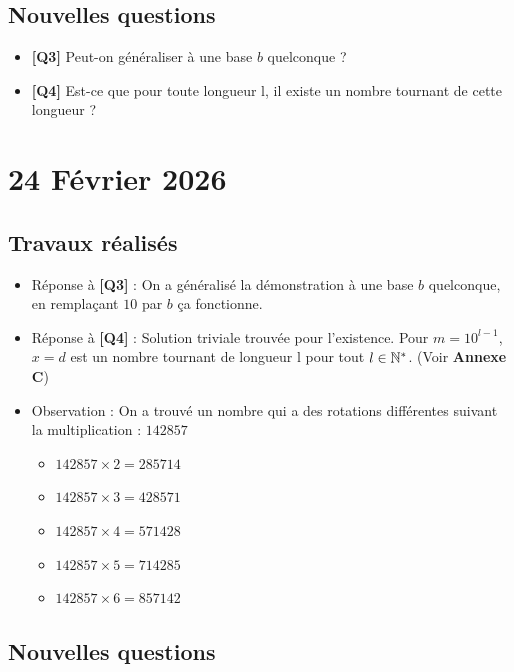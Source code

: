 \documentclass[a4paper,12pt]{article}
\begin{document}
\subsection*{Nouvelles questions}

\begin{itemize}[label=\textbullet]
    \item \textbf{[Q3]} Peut-on généraliser à une base $b$ quelconque ?
    \item \textbf{[Q4]} Est-ce que pour toute longueur l, il existe un nombre tournant de cette longueur ?
\end{itemize}

\clearpage

\section{24 Février 2026}

\subsection*{Travaux réalisés}

\begin{itemize}[label=\textbullet]
    \item Réponse à \textbf{[Q3]} : On a généralisé la démonstration à une base $b$ quelconque, en remplaçant $10$ par $b$ ça fonctionne.
    \item Réponse à \textbf{[Q4]} : Solution triviale trouvée pour l'existence. Pour $m=10^{l-1}$, $x=d$ est un nombre tournant de longueur l pour tout $l \in \mathbb{N}^*$. (Voir \textbf{Annexe C})
    \item Observation : On a trouvé un nombre qui a des rotations différentes suivant la multiplication : $142 857$
    \begin{itemize}
        \item $142 857 \times 2 = 285 714$
        \item $142 857 \times 3 = 428 571$
        \item $142 857 \times 4 = 571 428$
        \item $142 857 \times 5 = 714 285$
        \item $142 857 \times 6 = 857 142$
    \end{itemize}
\end{itemize}

\subsection*{Nouvelles questions}
\end{document}
